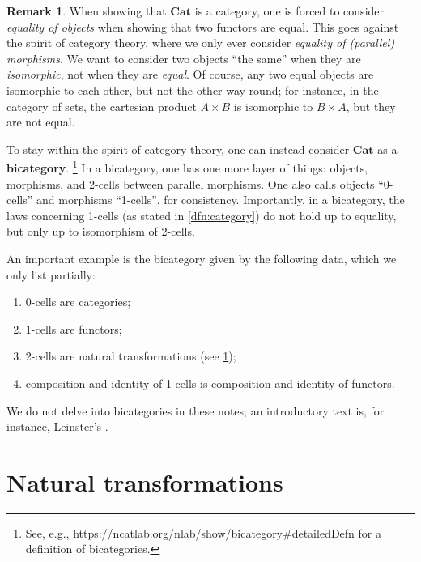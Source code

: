 \documentclass[a4paper,10pt]{scrartcl}
\theoremstyle{plain}
\theoremstyle{definition}
\newtheorem{rem}[thm]{Remark}
\newcommand{\Catb}[1]{\mathbf{#1}}
\newcommand{\CAT}{\Catb{Cat}}
\begin{document}
\begin{rem}
  When showing that $\CAT$ is a category, one is forced to consider \emph{equality of objects} when showing that two functors are equal.
  This goes against the spirit of category theory, where we only ever consider \emph{equality of (parallel) morphisms}.
  We want to consider two objects ``the same'' when they are \emph{isomorphic}, not when they are \emph{equal}. Of course, any two equal objects are isomorphic to each other, but not the other way round; for instance, in the category of sets, the cartesian product $A \times B$ is isomorphic to $B \times A$, but they are not equal.

  To stay within the spirit of category theory, one can instead consider $\CAT$ as a \textbf{bicategory}.%
  \footnote{See, e.g.,   \url{https://ncatlab.org/nlab/show/bicategory\#detailedDefn} for a definition of bicategories.}
  In a bicategory, one has one more layer of things: objects, morphisms, and 2-cells between parallel morphisms. One also calls objects ``0-cells'' and morphisms ``1-cells'', for consistency.
  Importantly, in a bicategory, the laws concerning 1-cells (as stated in \cref{dfn:category}) do not hold up to equality, but only up to isomorphism of 2-cells.

  An important example is the bicategory given by the following data, which we only list partially:
  \begin{enumerate}
  \item 0-cells are categories;
  \item 1-cells are functors;
  \item 2-cells are natural transformations (see \cref{sec:nat-trans});
  \item composition and identity of 1-cells is composition and identity of functors.
  \end{enumerate}

  We do not delve into bicategories in these notes; an introductory text is, for instance, Leinster's \cite{leinster:basic-bicats}.
\end{rem}




\section{Natural transformations}
\label{sec:nat-trans}
\end{document}
